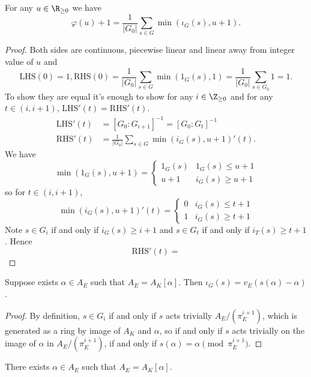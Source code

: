 \documentclass[a4paper]{article}
\begin{document}
\begin{lemma}
  For any \(u \in \R_{\geq 0}\) we have
  \[
    \varphi(u) + 1 = \frac{1}{|G_0|} \sum_{s \in G} \min(\iota_G(s), u + 1).
  \]
\end{lemma}

\begin{proof}
  Both sides are continuous, piecewise linear and linear away from integer value of \(u\) and
  \[
    \mathrm{LHS}(0) = 1, \mathrm{RHS}(0) = \frac{1}{|G_0|} \sum_{s \in G} \min(1_G(s), 1) = \frac{1}{|G_0|} \sum_{s \in G_0} 1 = 1.
  \]
  To show they are equal it's enough to show for any \(i \in \Z_{\geq 0}\) and for any \(t \in (i, i + 1)\), \(\mathrm{LHS}'(t) = \mathrm{RHS}'(t)\).
  \begin{align*}
    \mathrm{LHS}'(t) &= [G_0: G_{i + 1}]^{-1} = [G_0: G_t]^{-1} \\
    \mathrm{RHS}'(t) &= \frac{1}{|G_0|} \sum_{s \in G} \min(i_G(s), u + 1)'(t).
  \end{align*}
  We have
  \[
    \min(1_G(s), u + 1) =
    \begin{cases}
      1_G(s) & 1_G(s) \leq u + 1 \\
      u + 1 & i_G(s) \geq u + 1
    \end{cases}
  \]
  so for \(t \in (i, i + 1)\),
  \[
    \min(i_G(s), u + 1)'(t) =
    \begin{cases}
      0 & i_G(s) \leq t + 1 \\
      1 & i_G(s) \geq t + 1
    \end{cases}
  \]
  Note \(s \in G_i\) if and only if \(i_G(s) \geq i + 1\) and \(s \in G_t\) if and only if \(i_T(s) \geq t + 1\). Hence
  \[
    \mathrm{RHS}'(t) = 
  \]
\end{proof}

\begin{lemma}
  Suppose exists \(\alpha \in A_E\) such that \(A_E = A_K[\alpha]\). Then \(\iota_G(s) = v_E(s(\alpha) - \alpha)\).
\end{lemma}

\begin{proof}
  By definition, \(s \in G_i\) if and only if \(s\) acts trivially \(A_E/(\pi_E^{i + 1})\), which is generated as a ring by image of \(A_K\) and \(\alpha\), so if and only if \(s\) acts trivially on the image of \(\alpha\) in \(A_E/(\pi_E^{i + 1})\), if and only if \(s(\alpha) = \alpha \pmod{\pi_E^{i + 1}}\).
\end{proof}

\begin{lemma}
  There exists \(\alpha \in A_E\) such that \(A_E = A_K[\alpha]\).
\end{lemma}
\end{document}
